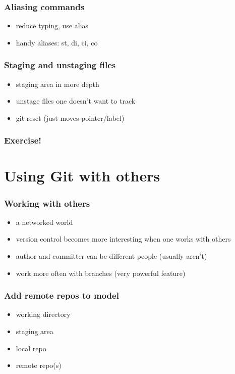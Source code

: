 \documentclass{git_course}
\begin{document}
\begin{frame}
\frametitle{Aliasing commands}
\begin{itemize}
    \item reduce typing, use alias
    \item handy aliases: st, di, ci, co
\end{itemize}
\end{frame}

\begin{frame}
\frametitle{Staging and unstaging files}
\begin{itemize}
    \item staging area in more depth
    \item unstage files one doesn't want to track
    \item git reset (just moves pointer/label)
\end{itemize}
\end{frame}

\begin{frame}
\frametitle{Exercise!}
\end{frame}

\section{Using Git with others}

\begin{frame}
\frametitle{Working with others}
\begin{itemize}
    \item a networked world
    \item version control becomes more interesting when one works with
        others
    \item author and committer can be different people (usually aren't)
    \item work more often with branches (very powerful feature)
\end{itemize}
\end{frame}

\begin{frame}
\frametitle{Add remote repos to model}
\begin{itemize}
    \item working directory
    \item staging area
    \item local repo
    \item remote repo(s)
\end{itemize}
\end{frame}
\end{document}
